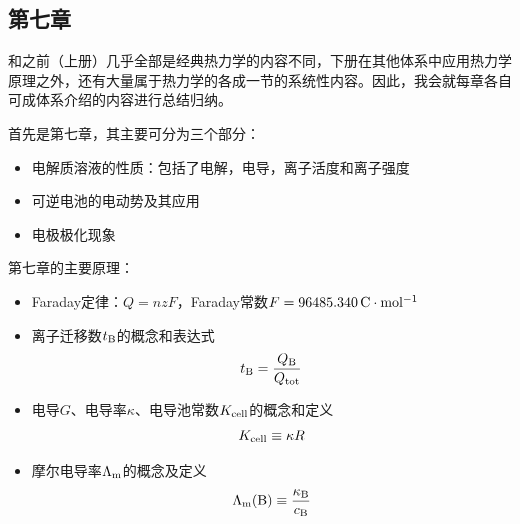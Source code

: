 \documentclass[9pt]{beamer}
\newcommand\B{{\rm B}}
\newcommand\m{{\rm m}}
\begin{document}
	\subsection{第七章}
	\begin{frame}
	
	{\color{blue}和之前（上册）几乎全部是经典热力学的内容不同，下册在其他体系中应用热力学原理之外，还有大量属于热力学的各成一节的系统性内容。因此，我会就每章各自可成体系介绍的内容进行总结归纳。}
	
	首先是第七章，其主要可分为三个部分：
	\begin{itemize}
	
	\item 电解质溶液的性质：包括了电解，电导，离子活度和离子强度
	
	\item 可逆电池的电动势及其应用
	
	\item 电极极化现象	
	
	\end{itemize}		
	
	第七章的主要原理：	
	\begin{itemize}
	
	\item Faraday定律：$Q=nzF$，Faraday常数$F=96485.340 \,{\rm C \cdot mol^{-1} }$
	
	\item 离子迁移数$t_\B$的概念和表达式
	\[
		t_\B = \frac{ Q_\B }{ Q_{\rm tot} }
	\]
	
	\item 电导$G$、电导率$\kappa$、电导池常数$K_{\rm cell}$的概念和定义
	\[
		K_{\rm cell} \equiv \kappa R
	\]
	
	\item 摩尔电导率$\Lambda_\m$的概念及定义
	\[
		\Lambda_\m(\B) \equiv \frac{ \kappa_\B }{ c_\B }
	\]
	
	\end{itemize}
	
	\end{frame}
	
\end{document}
